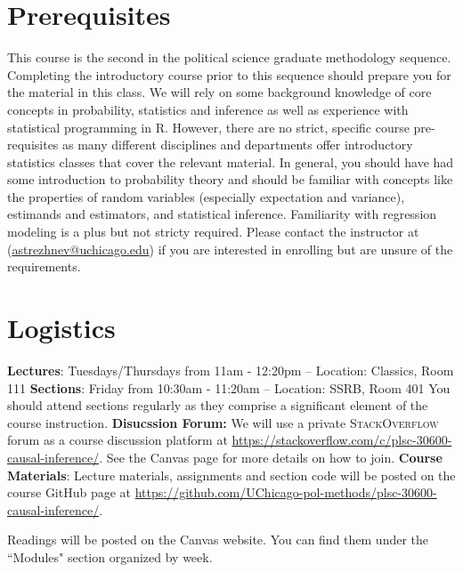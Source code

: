 \documentclass[11pt, article, oneside]{memoir}
\theoremstyle{Assumption}
\begin{document}
\section*{Prerequisites}

This course is the second in the political science graduate methodology sequence. Completing the introductory course prior to this sequence should prepare you for the material in this class. We will rely on some background knowledge of core concepts in probability, statistics and inference as well as experience with statistical programming in R. However, there are no strict, specific course pre-requisites as many different disciplines and departments offer introductory statistics classes that cover the relevant material. In general, you should have had some introduction to probability theory and should be familiar with concepts like the properties of random variables (especially expectation and variance), estimands and estimators, and statistical inference. Familiarity with regression modeling is a plus but not stricty required. Please contact the instructor at (\href{mailto:astrezhnev@uchicago.edu}{astrezhnev@uchicago.edu}) if you are interested in enrolling but are unsure of the requirements. 

\section*{Logistics}

\textbf{Lectures}: Tuesdays/Thursdays from 11am - 12:20pm -- Location: Classics, Room 111 
\newline\textbf{Sections}: Friday from 10:30am - 11:20am -- Location: SSRB, Room 401
\newline\newline
You should attend sections regularly as they comprise a significant element of the course instruction.
\newline\newline \textbf{Disucssion Forum:} We will use a private \textsc{StackOverflow} forum as a course discussion platform at \url{https://stackoverflow.com/c/plsc-30600-causal-inference/}. See the  Canvas page for more details on how to join.
\newline\newline\textbf{Course Materials}: Lecture materials, assignments and section code will be posted on the course GitHub page at \url{https://github.com/UChicago-pol-methods/plsc-30600-causal-inference/}.

Readings will be posted on the Canvas website. You can find them under the ``Modules" section organized by week.
\end{document}
